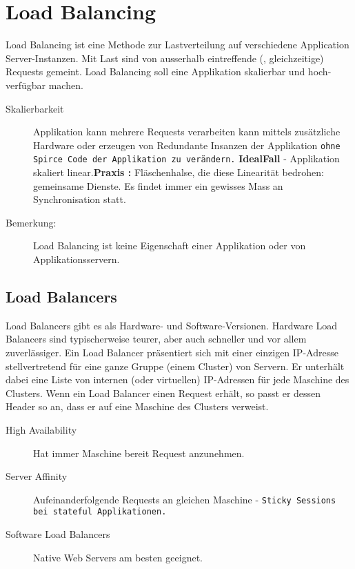 \documentclass[a4paper,10pt]{scrreprt}
\begin{document}
\chapter{Load Balancing} %
\label{cha:load_balancing}
Load Balancing ist eine Methode zur Lastverteilung auf verschiedene Application Server-Instanzen. Mit Last sind
von ausserhalb eintreffende (, gleichzeitige) Requests gemeint. Load Balancing soll eine Applikation skalierbar
und hoch-verfügbar machen.
\begin{description}
	\item[Skalierbarkeit] Applikation kann mehrere Requests verarbeiten kann mittels zusätzliche Hardware oder erzeugen von Redundante Insanzen der Applikation \texttt{ohne Spirce Code der Applikation zu verändern.} \textbf{IdealFall} - Applikation skaliert linear.\textbf{Praxis :} Fläschenhalse, die diese Linearität bedrohen: gemeinsame Dienste. Es findet immer ein gewisses Mass an Synchronisation statt.
	\item[Bemerkung:] Load Balancing ist keine Eigenschaft einer Applikation oder von Applikationsservern.
\end{description}
\section{Load Balancers} %
\label{sec:load_balancers}
Load Balancers gibt es als Hardware- und Software-Versionen. Hardware Load Balancers sind typischerweise
teurer, aber auch schneller und vor allem zuverlässiger.
Ein Load Balancer präsentiert sich mit einer einzigen IP-Adresse stellvertretend für eine ganze Gruppe (einem
Cluster) von Servern. Er unterhält dabei eine Liste von internen (oder virtuellen) IP-Adressen für jede Maschine
des Clusters. Wenn ein Load Balancer einen Request erhält, so passt er dessen Header so an, dass er auf eine
Maschine des Clusters verweist.
\begin{description}
	\item[High Availability] Hat immer Maschine bereit Request anzunehmen.
	\item[Server Affinity] Aufeinanderfolgende Requests an gleichen Maschine - \texttt{Sticky Sessions bei stateful Applikationen.} 
	\item[Software Load Balancers] Native Web Servers am besten geeignet.
\end{description}
\end{document}
